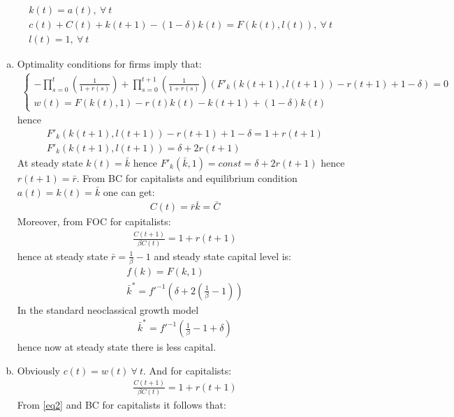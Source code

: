 \documentclass[a4paper]{article}
\begin{document}
\begin{enumerate}
\begin{itemize}
\begin{align*}
		&k(t) = a(t),\ \forall\ t\\
		&c(t) + C(t) + k(t+1) - (1 - \delta)k(t) = F(k(t), l(t)),\ \forall\ t\\
		&l(t) = 1,\ \forall\ t
		\end{align*}
	\end{itemize}
\begin{enumerate}[(a)]
	\item 	Optimality conditions for firms imply that:
	\begin{align}\label{eq1}
	\begin{cases}
	-\prod_{s=0}^{t}\left(\frac{1}{1+r(s)}\right) + \prod_{s=0}^{t+1}\left(\frac{1}{1+r(s)}\right)(F'_k(k(t+1), l(t+1)) - r(t+1) + 1 - \delta) = 0\\
	w(t) = F(k(t), 1) - r(t)k(t) - k(t+1) + (1 - \delta)k(t)
	\end{cases}
	\end{align}
	hence 
	\begin{align*}
	F'_k(k(t+1), l(t+1)) - r(t+1) + 1 - \delta = 1 + r(t+1)\\
	F'_k(k(t+1), l(t+1)) = \delta + 2r(t+1)
	\end{align*}
	At steady state $k(t) = \bar{k}$ hence $F'_k(\bar{k}, 1) = const = \delta + 2r(t+1)$ hence $r(t+1) = \bar{r}$. From BC for capitalists and equilibrium condition $a(t) = k(t) = \bar{k}$ one can get:
	\begin{align*}
	C(t) = \bar{r}\bar{k} = \bar{C}
	\end{align*}
	Moreover, from FOC for capitalists:
	\begin{align}
	\frac{C(t+1)}{\beta C(t)} = 1 + r(t+1)
	\end{align}
	hence at steady state $\bar{r} = \frac{1}{\beta}-1$ and steady state capital level is:
	\begin{align*}
	f(k) = F(k, 1)\\
	\bar{k}^* = f'^{-1}\left(\delta + 2\left(\frac{1}{\beta}-1\right)\right) 
	\end{align*}
	In the standard neoclassical growth model
	\begin{align*}
	\bar{k}^* = f'^{-1}\left(\frac{1}{\beta} - 1 + \delta\right)
	\end{align*}
	hence now at steady state there is less capital.
	\item Obviously $c(t) = w(t)\ \forall\ t$. And for capitalists:
	\begin{align}\label{eq2}
	\frac{C(t+1)}{\beta C(t)} = 1 + r(t+1)
	\end{align}
	From \eqref{eq2} and BC for capitalists it follows that:

\end{enumerate}
\end{enumerate}
\end{document}
